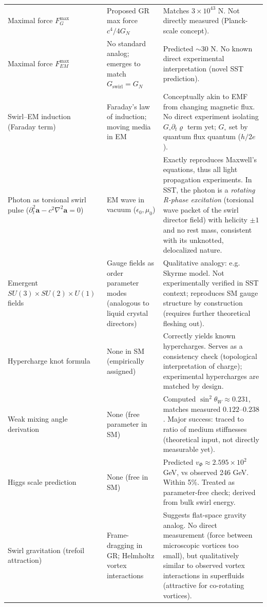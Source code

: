 \documentclass[reprint,aps,onecolumn,nofootinbib]{revtex4-2}
\begin{document}
\begin{table}[hbt!]
\begin{ruledtabular}
\begin{tabular}{|p{3.0cm} p{4.0cm} p{8.0cm}|}
				Maximal force $F_{\!G}^{\max}$ & Proposed GR max force $c^4/4G_N$ & Matches $3\times10^{43}$ N. Not directly measured (Planck-scale concept). \\
				Maximal force $F_{\!EM}^{\max}$ & No standard analog; emerges to match $G_{\text{swirl}}=G_N$ & Predicted $\sim30$ N. No known direct experimental interpretation (novel SST prediction). \\
				Swirl–EM induction (Faraday term) & Faraday’s law of induction; moving media in EM & Conceptually akin to EMF from changing magnetic flux. No direct experiment isolating $G_{\circ}\partial_t\varrho$ term yet; $G_{\circ}$ set by quantum flux quantum ($h/2e$). \\
                Photon as torsional swirl pulse
                ($\partial_t^2 \mathbf{a}-c^2\nabla^2\mathbf{a}=0$)
                & EM wave in vacuum ($\epsilon_0,\mu_0$)
                & Exactly reproduces Maxwell’s equations, thus all light propagation experiments. In SST, the photon is a \emph{rotating R-phase excitation} (torsional wave packet of the swirl director field) with helicity $\pm 1$ and no rest mass, consistent with its unknotted, delocalized nature. \\
                Emergent $SU(3)\times SU(2)\times U(1)$ fields & Gauge fields as order parameter modes (analogous to liquid crystal directors) & Qualitative analogy: e.g. Skyrme model. Not experimentally verified in SST context; reproduces SM gauge structure by construction (requires further theoretical fleshing out). \\
				Hypercharge knot formula & None in SM (empirically assigned) & Correctly yields known hypercharges. Serves as a consistency check (topological interpretation of charge); experimental hypercharges are matched by design. \\
				Weak mixing angle derivation & None (free parameter in SM) & Computed $\sin^2\theta_W \approx0.231$, matches measured $0.122$–$0.238$. Major success: traced to ratio of medium stiffnesses (theoretical input, not directly measurable yet). \\
				Higgs scale prediction & None (free in SM) & Predicted $v_{\Phi}\approx2.595\times10^2$ GeV, vs observed 246 GeV. Within 5\%. Treated as parameter-free check; derived from bulk swirl energy. \\
				Swirl gravitation (trefoil attraction) & Frame-dragging in GR; Helmholtz vortex interactions & Suggests flat-space gravity analog. No direct measurement (force between microscopic vortices too small), but qualitatively similar to observed vortex interactions in superfluids (attractive for co-rotating vortices). \\

\end{tabular}
\end{ruledtabular}
\end{table}
\end{document}
